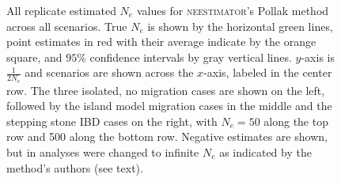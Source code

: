 \begin{landscape}
\begin{figure}[ht]
\centering
{}
\caption[All replicate estimated $N_e$ values for \textsc{neestimator}'s Pollak method across all scenarios.]{All replicate estimated $N_e$ values for \textsc{neestimator}'s Pollak method across all scenarios. True $N_e$ is shown by the horizontal green lines, point estimates in red with their average indicate by the orange square, and $95\%$ confidence intervals by gray vertical lines. $y$-axis is $\frac{1}{2 N_e}$ and scenarios are shown across the $x$-axis, labeled in the center row. The three isolated, no migration cases are shown on the left, followed by the island model migration cases in the middle and the stepping stone IBD cases on the right, with $N_e = 50$ along the top row and 500 along the bottom row. Negative estimates are shown, but in analyses were changed to infinite $N_e$ as indicated by the method's authors (see text).}
\label{fig:supp_pollak}
\end{figure}



\end{landscape}

